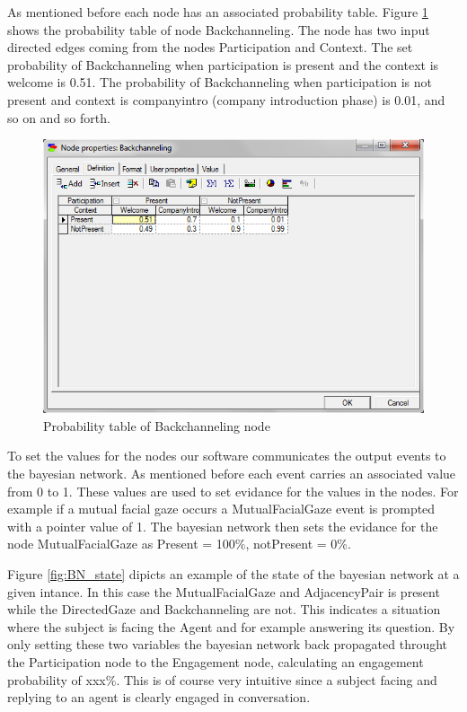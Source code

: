 \documentclass[12pt, a4paper, fleqn]{memoir}%
\begin{document}
As mentioned before each node has an associated probability table. Figure \ref{fig:BN_probability_table} shows the probability table of node Backchanneling. The node has two input directed edges coming from the nodes Participation and Context. The set probability of Backchanneling when participation is present and the context is welcome is 0.51. The probability of Backchanneling when participation is not present and context is companyintro (company introduction phase) is 0.01, and so on and so forth.

\begin{figure}[h!]
    \centering
    \includegraphics[width=1\textwidth]{BN_probability_table}
    \caption{Probability table of Backchanneling node}
    \label{fig:BN_probability_table}
\end{figure}

To set the values for the nodes our software communicates the output events to the bayesian network. As mentioned before each event carries an associated value from 0 to 1. These values are used to set evidance for the values in the nodes. For example if a mutual facial gaze occurs a MutualFacialGaze event is prompted with a pointer value of 1. The bayesian network then sets the evidance for the node MutualFacialGaze as Present = 100\%, notPresent = 0\%.

Figure \ref{fig:BN_state} dipicts an example of the state of the bayesian network at a given intance. In this case the MutualFacialGaze and AdjacencyPair is present while the DirectedGaze and Backchanneling are not. This indicates a situation where the subject is facing the Agent and for example answering its question. By only setting these two variables the bayesian network back propagated throught the Participation node to the Engagement node, calculating an engagement probability of xxx\%. This is of course very intuitive since a subject facing and replying to an agent is clearly engaged in conversation.
\end{document}
